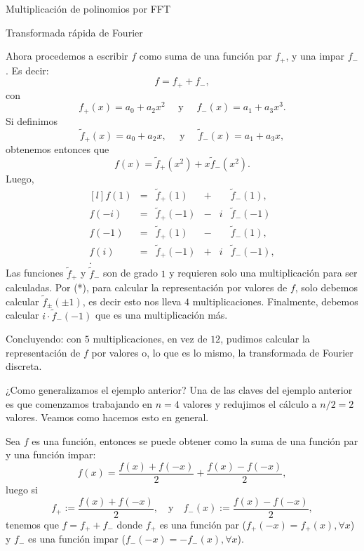 \begin{chapter}{Multiplicación de polinomios por FFT}
\begin{section}{Transformada rápida de Fourier}
\begin{ejemplo*}
            
            Ahora procedemos a escribir  $f $ como suma de una función par $f_+$, y una impar $f_-$. Es decir:
            $$
            f = f_+ + f_-,$$
            con 
            $$ f_+(x) = a_0 + a_2x^2 \quad  \text{ y } \quad f_-(x) = a_1 + a_3x^3.
            $$
            Si definimos 
            $$
            \tilde{f}_+(x) = a_0 + a_2 x, \quad \text{ y } \quad \tilde{f}_-(x) = a_1 + a_3 x,
            $$
            obtenemos entonces que 
            \begin{equation*}
                f(x) = \tilde{f}_+(x^2) + x \tilde{f}_-(x^2).
            \end{equation*}
            Luego,
            \begin{equation}
                \begin{matrix*}[l]
                    f(1) &=& \tilde{f}_+(1)& + & &\tilde{f}_-(1), \\
                    f(-i) &=& \tilde{f}_+(-1) &-&i & \tilde{f}_-(-1)\\
                    f(-1) &=& \tilde{f}_+(1)& -&  &\tilde{f}_-(1), \\
                    f(i) &=& \tilde{f}_+(-1)& +&  i&\tilde{f}_-(-1), \\.
                \end{matrix*} \tag{*}
            \end{equation}
            Las funciones $\tilde{f}_+$ y $\tilde{f}_-$ son de grado $1$ y requieren solo una multiplicación para ser calculadas. Por (*), para calcular la representación por valores de $f$, solo debemos calcular $\tilde{f}_\pm(\pm1)$,  es decir esto nos lleva $4$ multiplicaciones. Finalmente,  debemos  calcular $ i \cdot \tilde{f}_-(-1)$  que es una multiplicación más. 

            Concluyendo: con $5$ multiplicaciones,  en vez de $12$, pudimos calcular la representación de $f$ por valores o, lo que es lo mismo, la transformada de Fourier discreta.
        \end{ejemplo*}

        ¿Como generalizamos el ejemplo anterior? Una de las claves del ejemplo anterior es que comenzamos trabajando en $n=4$ valores y redujimos  el cálculo a $n/2=2$ valores. Veamos como hacemos esto en general.   

        Sea  $f$  es una función, entonces se puede obtener como la suma de una función par y una función impar: 
        $$
        f(x) = \frac{f(x) + f(-x)}{2} + \frac{f(x) - f(-x)}{2},  
        $$
        luego si
        $$
        f_+ := \frac{f(x) + f(-x)}{2}, \quad \text{y} \quad f_-(x):= \frac{f(x) - f(-x)}{2},  
        $$  
        tenemos que $f = f_+ + f_-$ donde $f_+$ es una función par ($f_+(-x) = f_+(x), \forall x$) y   $f_-$ es una función impar ($f_-(-x) = -f_-(x), \forall x$).
        

\end{section}
\end{chapter}
